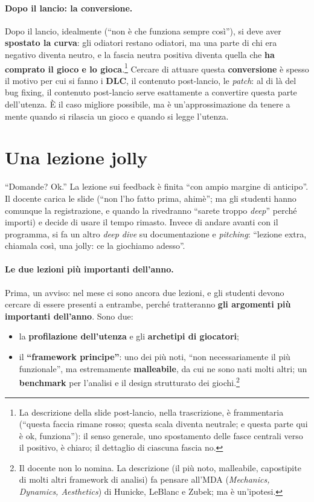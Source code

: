 \paragraph{Dopo il lancio: la conversione.} Dopo il lancio, idealmente
(``non è che funziona sempre così''), si deve aver \textbf{spostato la
curva}: gli odiatori restano odiatori, ma una parte di chi era negativo
diventa neutro, e la fascia neutra positiva diventa quella che \textbf{ha
comprato il gioco e lo gioca}.\footnote{La descrizione della slide
post-lancio, nella trascrizione, è frammentaria (``questa faccia rimane
rosso; questa scala diventa neutrale; e questa parte qui è ok, funziona''):
il senso generale, uno spostamento delle fasce centrali verso il positivo,
è chiaro; il dettaglio di ciascuna fascia no.} Cercare di attuare questa
\textbf{conversione} è spesso il motivo per cui si fanno i \textbf{DLC}, il
contenuto post-lancio, le \emph{patch}: al di là del bug fixing, il
contenuto post-lancio serve esattamente a convertire questa parte
dell'utenza. È il caso migliore possibile, ma è un'approssimazione da tenere
a mente quando si rilascia un gioco e quando si legge l'utenza.

\section{Una lezione jolly}
\label{gd10:sec:jolly}

``Domande? Ok.'' La lezione sui feedback è finita ``con ampio margine di
anticipo''. Il docente carica le slide (``non l'ho fatto prima, ahimè''; ma
gli studenti hanno comunque la registrazione, e quando la rivedranno
``sarete troppo \emph{deep}'' perché importi) e decide di usare il tempo
rimasto. Invece di andare avanti con il programma, si fa un altro
\emph{deep dive} su documentazione e \emph{pitching}: ``lezione extra,
chiamala così, una jolly: ce la giochiamo adesso''.

\paragraph{Le due lezioni più importanti dell'anno.} Prima, un avviso: nel
mese ci sono ancora due lezioni, e gli studenti devono cercare di essere
presenti a entrambe, perché tratteranno \textbf{gli argomenti più importanti
dell'anno}. Sono due:
\begin{itemize}
  \item la \textbf{profilazione dell'utenza} e gli \textbf{archetipi di
        giocatori};
  \item il \textbf{``framework principe''}: uno dei più noti, ``non
        necessariamente il più funzionale'', ma estremamente
        \textbf{malleabile}, da cui ne sono nati molti altri; un
        \textbf{benchmark} per l'analisi e il design strutturato dei
        giochi.\footnote{Il docente non lo nomina. La descrizione (il più
        noto, malleabile, capostipite di molti altri framework di analisi)
        fa pensare all'MDA (\emph{Mechanics, Dynamics, Aesthetics}) di
        Hunicke, LeBlanc e Zubek; ma è un'ipotesi.}
\end{itemize}


